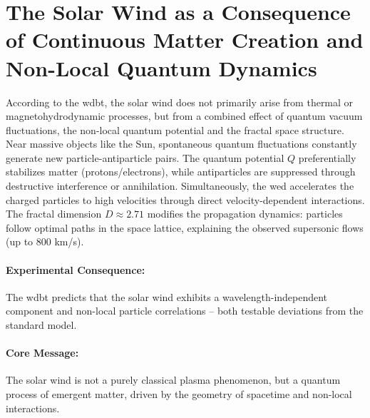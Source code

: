 \section{The Solar Wind as a Consequence of Continuous Matter Creation and Non-Local Quantum Dynamics}
According to the \gls{wdbt}, the solar wind does not primarily arise from thermal or magnetohydrodynamic processes, but from a combined effect of quantum vacuum fluctuations, the non-local quantum potential and the fractal space structure. Near massive objects like the Sun, spontaneous quantum fluctuations constantly generate new particle-antiparticle pairs. The quantum potential $Q$ preferentially stabilizes matter (protons/electrons), while antiparticles are suppressed through destructive interference or annihilation. Simultaneously, the \gls{wed} accelerates the charged particles to high velocities through direct velocity-dependent interactions. The fractal dimension $D \approx 2.71$ modifies the propagation dynamics: particles follow optimal paths in the space lattice, explaining the observed supersonic flows (up to 800 km/s).

\paragraph{Experimental Consequence:} The \gls{wdbt} predicts that the solar wind exhibits a wavelength-independent component and non-local particle correlations – both testable deviations from the standard model.

\paragraph{Core Message:} The solar wind is not a purely classical plasma phenomenon, but a quantum process of emergent matter, driven by the geometry of spacetime and non-local interactions.